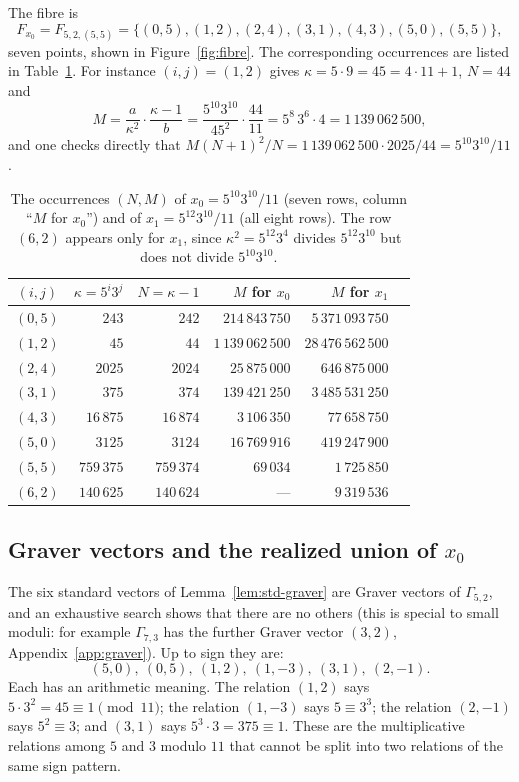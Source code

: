 The fibre is
\[
  F_{x_0}=F_{5,2,(5,5)}=\{(0,5),(1,2),(2,4),(3,1),(4,3),(5,0),(5,5)\},
\]
seven points, shown in Figure~\ref{fig:fibre}. The corresponding occurrences are listed in Table~\ref{tab:example}. For instance $(i,j)=(1,2)$ gives $\kappa=5\cdot9=45=4\cdot11+1$, $N=44$ and
\[
  M=\frac{a}{\kappa^2}\cdot\frac{\kappa-1}{b}=\frac{5^{10}3^{10}}{45^2}\cdot\frac{44}{11}=5^8\,3^6\cdot4=1\,139\,062\,500,
\]
and one checks directly that $M(N+1)^2/N=1\,139\,062\,500\cdot2025/44=5^{10}3^{10}/11$.

\begin{table}[ht]
\centering\small
\begin{tabular}{@{}cr rr rr@{}}
\toprule
$(i,j)$ & $\kappa=5^i3^j$ & $N=\kappa-1$ & $M$ for $x_0$ & $M$ for $x_1$\\
\midrule
$(0,5)$ & $243$ & $242$ & $214\,843\,750$ & $5\,371\,093\,750$\\
$(1,2)$ & $45$ & $44$ & $1\,139\,062\,500$ & $28\,476\,562\,500$\\
$(2,4)$ & $2025$ & $2024$ & $25\,875\,000$ & $646\,875\,000$\\
$(3,1)$ & $375$ & $374$ & $139\,421\,250$ & $3\,485\,531\,250$\\
$(4,3)$ & $16\,875$ & $16\,874$ & $3\,106\,350$ & $77\,658\,750$\\
$(5,0)$ & $3125$ & $3124$ & $16\,769\,916$ & $419\,247\,900$\\
$(5,5)$ & $759\,375$ & $759\,374$ & $69\,034$ & $1\,725\,850$\\
$(6,2)$ & $140\,625$ & $140\,624$ & --- & $9\,319\,536$\\
\bottomrule
\end{tabular}
\caption{The occurrences $(N,M)$ of $x_0=5^{10}3^{10}/11$ (seven rows, column ``$M$ for $x_0$'') and of $x_1=5^{12}3^{10}/11$ (all eight rows). The row $(6,2)$ appears only for $x_1$, since $\kappa^2=5^{12}3^4$ divides $5^{12}3^{10}$ but does not divide $5^{10}3^{10}$.}\label{tab:example}
\end{table}

\subsection{\texorpdfstring{Graver vectors and the realized union of $x_0$}{Graver vectors and the realized union of x0}}

The six standard vectors of Lemma~\ref{lem:std-graver} are Graver vectors of $\Gamma_{5,2}$, and an exhaustive search shows that there are no others (this is special to small moduli: for example $\Gamma_{7,3}$ has the further Graver vector $(3,2)$, Appendix~\ref{app:graver}). Up to sign they are:
\[
  (5,0),\ (0,5),\ (1,2),\ (1,-3),\ (3,1),\ (2,-1).
\]
Each has an arithmetic meaning. The relation $(1,2)$ says $5\cdot3^2=45\equiv1\pmod{11}$; the relation $(1,-3)$ says $5\equiv3^3$; the relation $(2,-1)$ says $5^2\equiv3$; and $(3,1)$ says $5^3\cdot3=375\equiv1$. These are the multiplicative relations among $5$ and $3$ modulo $11$ that cannot be split into two relations of the same sign pattern.

